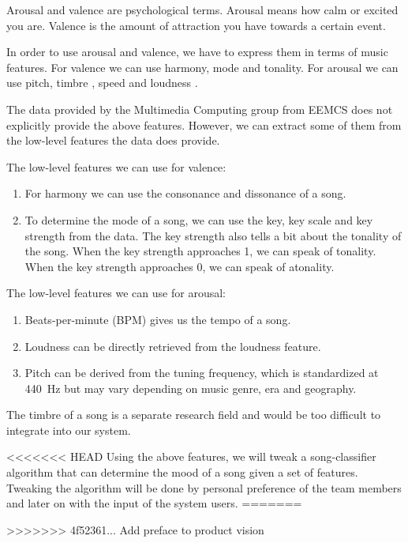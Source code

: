 Arousal and valence are psychological terms\cite{Thayer}.
Arousal means how calm or excited you are.
Valence is the amount of attraction you have towards a certain event.

In order to use arousal and valence, we have to express them in terms of music features.
For valence we can use harmony, mode and tonality\cite{DianaDeutsch}.
For arousal we can use pitch, timbre \cite{Liu03automaticmood}, speed and loudness \cite{PresentationMER}\cite{PaperME}.

\newpage

The data provided by the Multimedia Computing group from EEMCS does not explicitly provide the above features.
However, we can extract some of them from the low-level features the data does provide.

The low-level features we can use for valence:
\begin{enumerate}
\item For harmony we can use the consonance and dissonance of a song.
\item To determine the mode of a song, we can use the key, key scale and key strength from the data.
The key strength also tells a bit about the tonality of the song.
When the key strength approaches 1, we can speak of tonality. When the key strength approaches 0, we can speak of atonality.
\end{enumerate}
The low-level features we can use for arousal:
\begin{enumerate}
\item Beats-per-minute (BPM) gives us the tempo of a song.
\item Loudness can be directly retrieved from the loudness feature.
\item Pitch can be derived from the tuning frequency, which is standardized at \SI{440}{\hertz} but may vary depending on music genre, era and geography.
\end{enumerate}

The timbre of a song is a separate research field and would be too difficult to integrate into our system.

<<<<<<< HEAD
Using the above features, we will tweak a song-classifier algorithm that can determine the mood of a song given a set of features.
Tweaking the algorithm will be done by personal preference of the team members and later on with the input of the system users.
=======
%
%
{}



>>>>>>> 4f52361... Add preface to product vision
